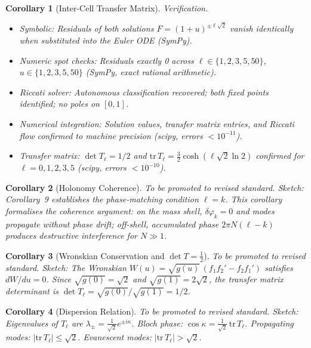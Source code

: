 \documentclass[12pt]{amsart}
\newtheorem{corollary}{Corollary}
\begin{document}
\begin{corollary}[Inter-Cell Transfer Matrix]
\medskip
\textit{Verification.}
\begin{itemize}
\item Symbolic: Residuals of both solutions $F = (1+u)^{\pm\ell\sqrt{2}}$ vanish identically
  when substituted into the Euler ODE (SymPy).
\item Numeric spot checks: Residuals exactly 0 across
  $\ell \in \{1,2,3,5,50\}$, $u \in \{1,2,3,5,50\}$ (SymPy, exact rational arithmetic).
\item Riccati solver: Autonomous classification recovered; both fixed points identified;
  no poles on $[0,1]$.
\item Numerical integration: Solution values, transfer matrix entries, and Riccati flow
  confirmed to machine precision (scipy, errors $< 10^{-11}$).
\item Transfer matrix: $\det T_\ell = 1/2$ and
  $\mathrm{tr}\, T_\ell = \tfrac{3}{2}\cosh(\ell\sqrt{2}\ln 2)$ confirmed for
  $\ell = 0,1,2,3,5$ (scipy, errors $< 10^{-10}$).
\end{itemize}
\end{corollary}

\begin{corollary}[Holonomy Coherence]
To be promoted to revised standard. \textit{Sketch:} Corollary~9 establishes the phase-matching
condition $\ell = k$. This corollary formalises the coherence argument: on the mass shell,
$\delta\varphi_k = 0$ and modes propagate without phase drift; off-shell, accumulated phase
$2\pi N(\ell - k)$ produces destructive interference for $N \gg 1$.
\end{corollary}

\begin{corollary}[Wronskian Conservation and $\det T = \tfrac{1}{2}$]
To be promoted to revised standard. \textit{Sketch:} The Wronskian
$W(u) = \sqrt{g(u)}\,(f_1 f_2' - f_2 f_1')$ satisfies $dW/du = 0$. Since
$\sqrt{g(0)} = \sqrt{2}$ and $\sqrt{g(1)} = 2\sqrt{2}$, the transfer matrix determinant is
$\det T_\ell = \sqrt{g(0)}/\sqrt{g(1)} = 1/2$.
\end{corollary}

\begin{corollary}[Dispersion Relation]
To be promoted to revised standard. \textit{Sketch:} Eigenvalues of $T_\ell$ are
$\lambda_\pm = \tfrac{1}{\sqrt{2}} e^{\pm i\kappa}$. Bloch phase:
$\cos\kappa = \tfrac{1}{\sqrt{2}}\,\mathrm{tr}\, T_\ell$. Propagating modes:
$|\mathrm{tr}\, T_\ell| \le \sqrt{2}$. Evanescent modes: $|\mathrm{tr}\, T_\ell| > \sqrt{2}$.
\end{corollary}
\end{document}
